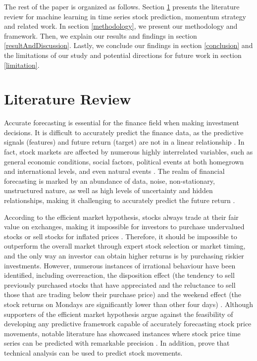 \documentclass{article}
\begin{document}
The rest of the paper is organized as follows. Section \ref{literatureReview} presents the literature review for machine learning in time series stock prediction, momentum strategy and related work. In section \ref{methodology}, we present our methodology and framework. Then, we explain our results and findings in section \ref{resultAndDiscussion}. Lastly, we conclude our findings in section \ref{conclusion} and the limitations of our study and potential directions for future work in section \ref{limitation}. 
\section{Literature Review}
\label{literatureReview}

Accurate forecasting is essential for the finance field when making investment decisions. It is difficult to accurately predict the finance data, as the predictive signals (features) and future return (target) are not in a linear relationship \citep{fischer2018deep}. In fact, stock markets are affected by numerous highly interrelated variables, such as general economic conditions, social factors, political events at both homegrown and international levels, and even natural events \citep{enke2005use, nti2020systematic}. The realm of financial forecasting is marked by an abundance of data, noise, non-stationary, unstructured nature, as well as high levels of uncertainty and hidden relationships, making it challenging to accurately predict the future return \citep{bao2004forecasting}.

According to the efficient market hypothesis, stocks always trade at their fair value on exchanges, making it impossible for investors to purchase undervalued stocks or sell stocks for inflated prices \citep{yen2008efficient}. Therefore, it should be impossible to outperform the overall market through expert stock selection or market timing, and the only way an investor can obtain higher returns is by purchasing riskier investments. However, numerous instances of irrational behaviour have been identified, including overreaction, the disposition effect (the tendency to sell previously purchased stocks that have appreciated and the reluctance to sell those that are trading below their purchase price) and the weekend effect (the stock returns on Mondays are significantly lower than other four days) \citep{hsu2016bridging}. Although supporters of the efficient market hypothesis argue against the feasibility of developing any predictive framework capable of accurately forecasting stock price movements, notable literature has showcased instances where stock price time series can be predicted with remarkable precision \citep{lewellen2002momentum, schwartz1977time}. In addition, \cite{lo2000foundations} prove that technical analysis can be used to predict stock movements.  
\end{document}
